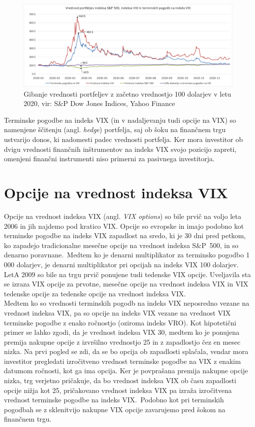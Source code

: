 \documentclass[12pt,a4paper, reqno]{amsart}
\theoremstyle{definition} %
\theoremstyle{plain} %
\begin{document}
\begin{figure}[!h]
\centering
\includegraphics[width = 15 cm]{Grafi/Portfolio_VIX_futures_2020.png}
\caption{Gibanje vrednosti portfeljev z začetno vrednostjo 100 dolarjev v letu 2020, vir: S\&P Dow Jones Indices, Yahoo Finance}
\label{Graf 5}
\end{figure}

Terminske pogodbe na indeks VIX (in v nadaljevanju tudi opcije na VIX) so namenjene ščitenju (angl. \textit{hedge}) portfelja, saj ob šoku na finančnem trgu ustvarijo donos, ki nadomesti padec vrednosti portfelja. Ker mora investitor ob dvigu vrednosti finančnih inštrumentov na indeks VIX svojo pozicijo zapreti, omenjeni finančni instrumenti niso primerni za pasivnega investitorja.

\section{Opcije na vrednost indeksa VIX}
Opcije na vrednost indeksa VIX (angl. \textit{VIX options}) so bile prvič na voljo leta 2006 in jih najdemo pod kratico VIX. Opcije so evropske in imajo podobno kot terminske pogodbe na indeks VIX zapadlost na sredo, ki je 30 dni pred petkom, ko zapadejo tradicionalne mesečne opcije na vrednost indeksa S\&P~500, in so denarno poravnane.\
Medtem ko je denarni multiplikator za terminsko pogodbo 1\,000 dolarjev, je denarni multiplikator pri opcijah na indeks VIX 100 dolarjev.
LetA 2009 so bile na trgu prvič ponujene tudi tedenske VIX opcije. Uveljavila sta se izraza VIX opcije za prvotne, mesečne opcije na vrednost indeksa VIX in VIX tedenske opcije za tedenske opcije na vrednost indeksa VIX.\\

Medtem ko so vrednosti terminskih pogodb na indeks VIX neposredno vezane na vrednost indeksa VIX, pa so opcije na indeks VIX vezane na vrednost VIX terminske pogodbe z enako ročnostjo (oziroma indeks VRO). Kot hipotetični primer se lahko zgodi, da je vrednost indeksa VIX 30, medtem ko je ponujena premija nakupne opcije z izvršilno vrednostjo 25 in z zapadlostjo čez en mesec nizka. Na prvi pogled se zdi, da se bo opcija ob zapadlosti splačala, vendar mora investitor pregledati izročitveno vrednost terminske pogodbe na VIX z enakim datumom ročnosti, kot ga ima opcija. Ker je povprašana premija nakupne opcije nizka, trg verjetno pričakuje, da bo vrednost indeksa VIX ob času zapadlosti opcije nižja kot 25, pričakovano vrednost indeksa VIX pa izraža izročitvena vrednost terminske pogodbe na indeks VIX.\
Podobno kot pri terminskih pogodbah se z sklenitvijo nakupne VIX opcije zavarujemo pred šokom na finančnem trgu.\\
\end{document}
